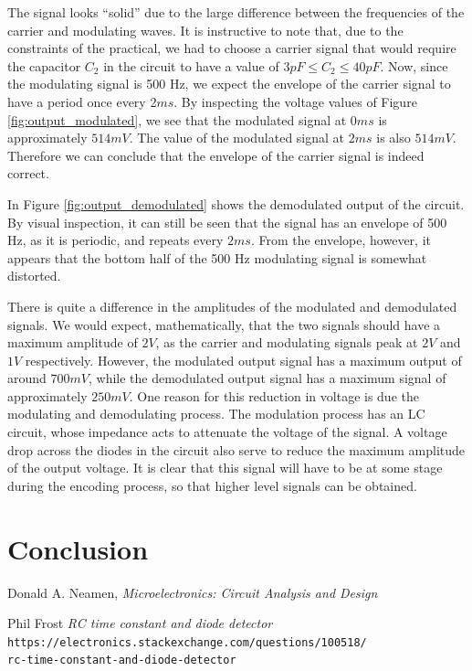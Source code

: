 \documentclass[12pt, a4paper]{article}
\begin{document}
	The signal looks ``solid'' due to the large difference between the frequencies of the carrier and modulating waves. It is instructive to note that, due to the constraints of the practical, we had to choose a carrier signal that would require the capacitor $C_2$ in the circuit to have a value of $3pF \le C_2 \le 40pF$. Now, since the modulating signal is 500 Hz, we expect the envelope of the carrier signal to have a period once every 2$ms$. By inspecting the voltage values of Figure \ref{fig:output_modulated}, we see that the modulated signal at 0$ms$ is approximately $514mV$. The value of the modulated signal at $2ms$ is also $514mV$. Therefore we can conclude that the envelope of the carrier signal is indeed correct.

	In Figure \ref{fig:output_demodulated} shows the demodulated output of the circuit. By visual inspection, it can still be seen that the signal has an envelope of 500 Hz, as it is periodic, and repeats every $2ms$. From the envelope, however, it appears that the bottom half of the 500 Hz modulating signal is somewhat distorted.\linebreak

	There is quite a difference in the amplitudes of the modulated and demodulated signals. We would expect, mathematically, that the two signals should have a maximum amplitude of $2V$, as the carrier and modulating signals peak at $2V$ and $1V$ respectively. However, the modulated output signal has a maximum output of around $700mV$, while the demodulated output signal has a maximum signal of approximately $250mV$. One reason for this reduction in voltage is due the modulating and demodulating process. The modulation process has an LC circuit, whose impedance acts to attenuate the voltage of the signal. A voltage drop across the diodes in the circuit also serve to reduce the maximum amplitude of the output voltage. It is clear that this signal will have to be at some stage during the encoding process, so that higher level signals can be obtained.

\section{Conclusion} %
\label{sec:conclusion}
	

\begin{thebibliography}{500}

	  Donald A. Neamen,
	  \textit{Microelectronics: Circuit Analysis and Design}

	Phil Frost
	\textit{RC time constant and diode detector}
	\texttt{https://electronics.stackexchange.com/questions/100518/\\rc-time-constant-and-diode-detector}

\end{thebibliography}
\end{document}
